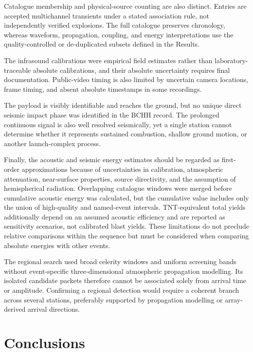 \documentclass[]{seismica}
\begin{document}
Catalogue membership and physical-source counting are also distinct. Entries
are accepted multichannel transients under a stated association rule, not
independently verified explosions. The full catalogue preserves
chronology, whereas waveform, propagation, coupling, and energy interpretations
use the quality-controlled or de-duplicated subsets defined in the Results.

The infrasound calibrations were empirical field estimates rather than
laboratory-traceable absolute calibrations, and their absolute uncertainty
requires final documentation. Public-video timing is also limited by uncertain
camera locations, frame timing, and absent absolute timestamps in some
recordings.

The payload is visibly identifiable and reaches the ground, but no unique
direct seismic impact phase was identified in the BCHH record. The prolonged
continuous signal is also well resolved seismically, yet a single
station cannot determine whether it represents sustained combustion, shallow
ground motion, or another launch-complex process.

Finally, the acoustic and seismic energy estimates should be regarded as
first-order approximations because of uncertainties in calibration,
atmospheric attenuation, near-surface properties, source directivity, and the
assumption of hemispherical radiation. Overlapping catalogue windows were
merged before cumulative acoustic energy was calculated, but the cumulative
value includes only the union of high-quality and named-event intervals.
TNT-equivalent total yields additionally depend on an assumed acoustic
efficiency and are reported as sensitivity scenarios, not calibrated blast
yields. These limitations do not preclude relative comparisons within the
sequence but must be considered when comparing absolute energies with other
events.

The regional search used broad celerity windows and uniform screening bands
without event-specific three-dimensional atmospheric propagation modelling.
Its isolated candidate packets therefore cannot be associated solely from
arrival time or amplitude. Confirming a regional detection would require a
coherent branch across several stations, preferably supported by propagation
modelling or array-derived arrival directions.

\section{Conclusions}
\label{sec:conclusions}
\end{document}
